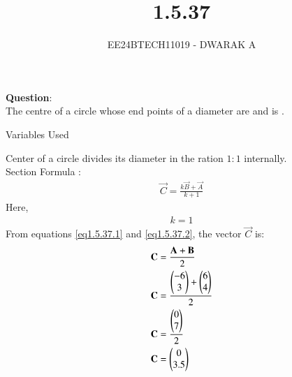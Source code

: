 \documentclass[journal]{IEEEtran}
\begin{document}

\vspace{3cm}

\title{1.5.37}
\author{EE24BTECH11019 - DWARAK A}
{\let\newpage\relax\maketitle}

\renewcommand{\thefigure}{\theenumi}
\renewcommand{\thetable}{\theenumi}
\setlength{\intextsep}{10pt} %


\renewcommand{\thetable}{\theenumi}


\textbf{Question}:
\\
The centre of a circle whose end points of a diameter are  and  is \underline{\hspace{1cm}} .
\\

\solution
\begin{table}[h!]    
  \centering
  
  \caption{Variables Used}
  \label{tab1.5.37.1}
\end{table}

Center of a circle divides its diameter in the ration $1:1$ internally.\\

Section Formula :
\begin{align}
    \vec{C}=\frac{k\vec{B}+\vec{A}}{k+1}\label{eq1.5.37.1}
\end{align}
Here,
\begin{align}
    k=1\label{eq1.5.37.2}
\end{align}
From  equations \ref{eq1.5.37.1} and \ref{eq1.5.37.2}, the vector $\vec{C}$ is:
\begin{align}
    \mathbf{C}&=\frac{\mathbf{A}+\mathbf{B}}{2}\\
    \mathbf{C}&=\frac{\begin{pmatrix}-6\\3\end{pmatrix}+\begin{pmatrix}6\\4\end{pmatrix}}{2}\\
    \mathbf{C}&=\frac{\begin{pmatrix}0\\7\end{pmatrix}}{2}\\
    \mathbf{C}&=\begin{pmatrix}0\\3.5\end{pmatrix}
\end{align}
\end{document}
